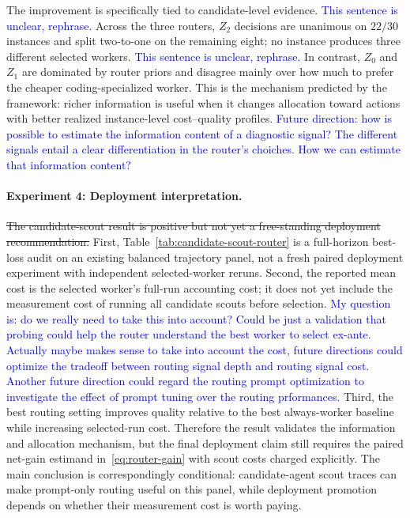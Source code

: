 \documentclass{article}
\begin{document}
The improvement is specifically tied to candidate-level evidence. \textcolor{blue}{This sentence is unclear, rephrase.}
Across the three routers, \(Z_2\) decisions are unanimous on \(22/30\) instances and split two-to-one on the remaining eight; no instance produces three different selected workers. \textcolor{blue}{This sentence is unclear, rephrase.}
In contrast, \(Z_0\) and \(Z_1\) are dominated by router priors and disagree mainly over how much to prefer the cheaper coding-specialized worker.
This is the mechanism predicted by the framework: richer information is useful when it changes allocation toward actions with better realized instance-level cost--quality profiles. \textcolor{blue}{Future direction: how is possible to estimate the information content of a diagnostic signal? The different signals entail a clear differentiation in the router's choiches. How we can estimate that information content?}

\paragraph{Experiment 4: Deployment interpretation.}
\sout{The candidate-scout result is positive but not yet a free-standing deployment recommendation.}
First, Table~\ref{tab:candidate-scout-router} is a full-horizon best-loss audit on an existing balanced trajectory panel, not a fresh paired deployment experiment with independent selected-worker reruns.
Second, the reported mean cost is the selected worker's full-run accounting cost; it does not yet include the measurement cost of running all candidate scouts before selection.
\textcolor{blue}{My question is: do we really need to take this into account? Could be just a validation that probing could help the router understand the best worker to select ex-ante. Actually maybe makes sense to take into account the cost, future directions could optimize the tradeoff between routing signal depth and routing signal cost. Another future direction could regard the routing prompt optimization to investigate the effect of prompt tuning over the routing prformances. }
Third, the best routing setting improves quality relative to the best always-worker baseline while increasing selected-run cost.
Therefore the result validates the information and allocation mechanism, but the final deployment claim still requires the paired net-gain estimand in~\eqref{eq:router-gain} with scout costs charged explicitly.
The main conclusion is correspondingly conditional: candidate-agent scout traces can make prompt-only routing useful on this panel, while deployment promotion depends on whether their measurement cost is worth paying.
\end{document}
